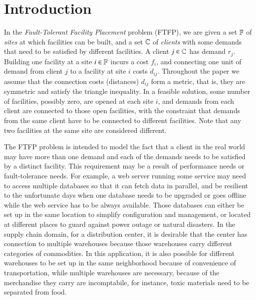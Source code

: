 \section{Introduction}

In the \emph{Fault-Tolerant Facility Placement} problem
(FTFP), we are given a set $\mathbb{F}$ of \emph{sites} at
which facilities can be built, and a set $\mathbb{C}$ of
\emph{clients} with some demands that need to be satisfied
by different facilities. A client $j\in\mathbb{C}$ has
demand $r_j$. Building one facility at a site
$i\in\mathbb{F}$ incurs a cost $f_i$, and connecting one unit
of demand from client $j$ to a facility at site $i$ costs
$d_{ij}$. Throughout the paper we assume that the connection
costs (distances) $d_{ij}$ form a metric, that is, they are
symmetric and satisfy the triangle inequality. In a feasible
solution, some number of facilities, possibly zero, are
opened at each site $i$, and demands from each client are
connected to those open facilities, with the constraint that
demands from the same client have to be connected to
different facilities. Note that any two facilities at the
same site are considered different.

The FTFP problem is intended to model the fact that a client
in the real world may have more than one demand and each of
the demands needs to be satisfied by a distinct
facility. This requirement may be a result of performance
needs or fault-tolerance needs. For example, a web server
running some service may need to access multiple databases
so that it can fetch data in parallel, and be resilient to
the unfortunate days when one database needs to be upgraded
or goes offline while the web service has to be always
available. Those databases can either be set up in the same
location to simplify configuration and management, or
located at different places to guard against power outage or
natural disasters. In the supply chain domain, for a
distribution center, it is desirable that the center has
connection to multiple warehouses because those warehouses
carry different categories of commodities. In this
application, it is also possible for different warehouses to
be set up in the same neighborhood because of convenience of
transportation, while multiple warehouses are necessary,
because of the merchandise they carry are incomptabile, for
instance, toxic materials need to be separated from food.

